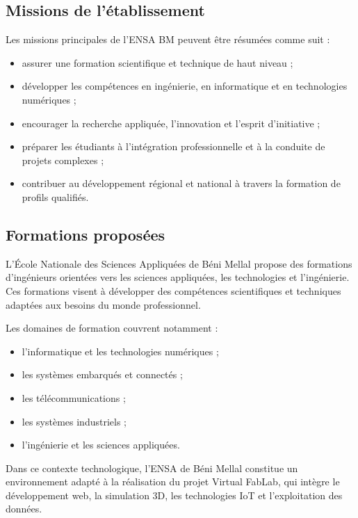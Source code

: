 \subsection{Missions de l’établissement}

Les missions principales de l’ENSA BM peuvent être résumées comme suit :

\begin{itemize}
    \item assurer une formation scientifique et technique de haut niveau ;
    \item développer les compétences en ingénierie, en informatique et en technologies numériques ;
    \item encourager la recherche appliquée, l’innovation et l’esprit d’initiative ;
    \item préparer les étudiants à l’intégration professionnelle et à la conduite de projets complexes ;
    \item contribuer au développement régional et national à travers la formation de profils qualifiés.
\end{itemize}

\subsection{Formations proposées}

L'École Nationale des Sciences Appliquées de Béni Mellal propose des formations d'ingénieurs orientées vers les sciences appliquées, les technologies et l'ingénierie. Ces formations visent à développer des compétences scientifiques et techniques adaptées aux besoins du monde professionnel.

Les domaines de formation couvrent notamment :

\begin{itemize}
    \item l'informatique et les technologies numériques ;
    \item les systèmes embarqués et connectés ;
    \item les télécommunications ;
    \item les systèmes industriels ;
    \item l'ingénierie et les sciences appliquées.
\end{itemize}

Dans ce contexte technologique, l'ENSA de Béni Mellal constitue un environnement adapté à la réalisation du projet Virtual FabLab, qui intègre le développement web, la simulation 3D, les technologies IoT et l'exploitation des données.

